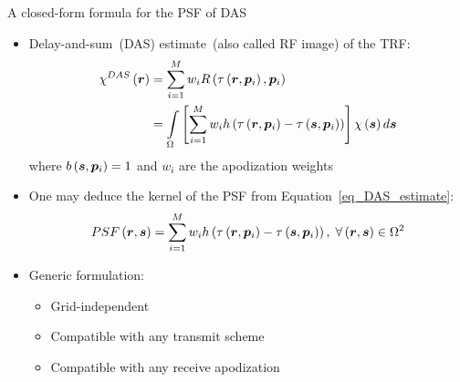 {\begin{block}{A closed-form formula for the PSF of DAS}
	\begin{itemize}
		\item Delay-and-sum~(DAS) estimate~(also called RF image) of the TRF:
		\begin{align}
		\label{eq_DAS_estimate}
			\chi^{DAS} \left(\bm{r}\right) &= \sum \limits_{i=1}^{M} w_i R \left(\tau \left(\bm{r}, \bm{p}_i\right), \bm{p}_i\right) \nonumber \\
			&= \int \limits_{\Omega} \left[\sum \limits_{i=1}^{M} w_i h \left(\tau \left(\bm{r}, \bm{p}_i\right) - \tau \left(\bm{s}, \bm{p}_i\right) \right)\right] \chi\left(\bm{s}\right) d \bm{s}
		\end{align}
		where $b \left(\bm{s}, \bm{p}_i\right) = 1$ and $w_i$ are the apodization weights
		\item One may deduce the kernel of the PSF from Equation~\eqref{eq_DAS_estimate}:
		\begin{equation}
			\label{eq_PSF_estimate}
			PSF \left(\bm{r}, \bm{s}\right) = \sum \limits_{i=1}^{M} w_i h \left(\tau \left(\bm{r}, \bm{p}_i\right) - \tau \left(\bm{s}, \bm{p}_i\right) \right), \; \forall \left(\bm{r}, \bm{s}\right) \in \Omega^2
		\end{equation}
		\item Generic formulation:
		\begin{itemize}
			\item Grid-independent
			\item Compatible with any transmit scheme
			\item Compatible with any receive apodization 
		\end{itemize}
	\end{itemize}
\end{block}
\vfill


}
